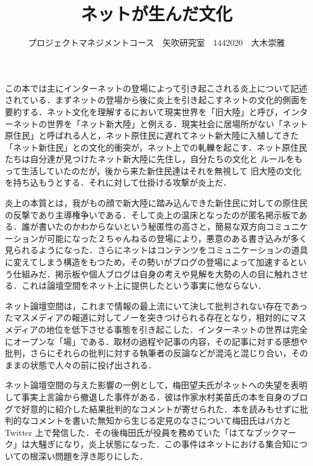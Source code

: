 \documentclass[uplatex,twocolumn,dvipdfmx]{jsarticle}
\title{\vspace{-5mm}\fontsize{14pt}{0pt}\selectfont ネットが生んだ文化}
\author{\normalsize プロジェクトマネジメントコース　矢吹研究室　1442020　大木崇雅}
\date{}
\begin{document}
\fontsize{10.5pt}{\baselineskip}\selectfont
\maketitle







この本では主にインターネットの登場によって引き起こされる炎上について記述されている．まずネットの登場から後に炎上を引き起こすネットの文化的側面を要約する．ネット文化を理解するにおいて現実世界を「旧大陸」と呼び，インターネットの世界を「ネット新大陸」と例える．現実社会に居場所がない「ネット原住民」と呼ばれる人と，ネット原住民に遅れてネット新大陸に入植してきた「ネット新住民」との文化的衝突が，ネット上での軋轢を起こす．ネット原住民たちは自分達が見つけたネット新大陸に先住し，自分たちの文化と ルールをもって生活していたのだが，後から来た新住民達はそれを無視して   旧大陸の文化を持ち込もうとする．それに対して仕掛ける攻撃が炎上だ．

炎上の本質とは，我がもの顔で新大陸に踏み込んできた新住民に対しての原住民の反撃であり主導権争いである．そして炎上の温床となったのが匿名掲示板である．誰が書いたのかわからないという秘匿性の高さと，簡易な双方向コミュニケーションが可能になった２ちゃんねるの登場により，悪意のある書き込みが多く見られるようになった．さらにネットはコンテンツをコミュニケーションの道具に変えてしまう構造をもつため，その勢いがブログの登場によって加速するという仕組みだ．掲示板や個人ブログは自身の考えや見解を大勢の人の目に触れさせる．これは論壇空間をネット上に提供したという事実に他ならない．

ネット論壇空間は，これまで情報の最上流にいて決して批判されない存在であったマスメディアの報道に対してノーを突きつけられる存在となり，相対的にマスメディアの地位を低下させる事態を引き起こした．インターネットの世界は完全にオープンな「場」である．取材の過程や記事の内容，その記事に対する感想や批判，さらにそれらの批判に対する執筆者の反論などが混沌と混じり合い，そのままの状態で人々の前に投げ出される．

ネット論壇空間の与えた影響の一例として，梅田望夫氏がネットへの失望を表明して事実上言論から撤退した事件がある．彼は作家水村美苗氏の本を自身のブログで好意的に紹介した結果批判的なコメントが寄せられた．本を読みもせずに批判的なコメントを書いた無知から生じる定見のなさについて梅田氏はバカと Twitter 上で発信した．その後梅田氏が役員を務めていた「はてなブックマーク」は大騒ぎになり，炎上状態になった．この事件はネットにおける集合知についての根深い問題を浮き彫りにした．
\end{document}
